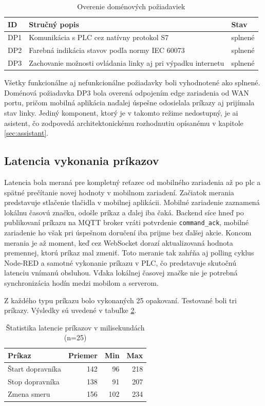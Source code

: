 \begin{table}[H]
\centering
\caption{Overenie doménových požiadaviek}
\label{tab:test-dp}
\begin{tabular}{|l|p{12cm}|l|}
\hline
\textbf{ID} & \textbf{Stručný popis} & \textbf{Stav} \\
\hline
DP1 & Komunikácia s PLC cez natívny protokol S7 & splnené \\
DP2 & Farebná indikácia stavov podľa normy IEC 60073 & splnené \\
DP3 & Zachovanie možnosti ovládania linky aj pri výpadku internetu & splnené \\
\hline
\end{tabular}
\end{table}

Všetky funkcionálne aj nefunkcionálne požiadavky boli vyhodnotené ako splnené. Doménová požiadavka DP3 bola overená odpojením edge zariadenia od WAN portu, pričom mobilná aplikácia naďalej úspešne odosielala príkazy aj prijímala stav linky. Jediný komponent, ktorý je v takomto režime nedostupný, je \acrshort{ai} asistent, čo zodpovedá architektonickému rozhodnutiu opísanému v kapitole \ref{sec:assistant}.

\subsection{Latencia vykonania príkazov}
\label{sec:latencia}

Latencia bola meraná pre kompletný reťazec od mobilného zariadenia až po \acrshort{plc} a spätné prečítanie novej hodnoty v mobilnom zariadení. Začiatok merania predstavuje stlačenie tlačidla v mobilnej aplikácii. Mobilné zariadenie zaznamená lokálnu časovú značku, odošle príkaz a ďalej iba čaká. Backend síce hneď po publikovaní príkazu na MQTT broker vráti potvrdenie \texttt{command\_ack}, mobilné zariadenie ho však pri úspešnom doručení iba prijme bez ďalšej akcie. Koncom merania je až moment, keď cez WebSocket dorazí aktualizovaná hodnota premennej, ktorú príkaz mal zmeniť. Toto meranie tak zahŕňa aj polling cyklus Node-RED a samotné vykonanie príkazu v PLC, čo predstavuje skutočnú latenciu vnímanú obsluhou. Vďaka lokálnej časovej značke nie je potrebná synchronizácia hodín medzi mobilom a serverom.


Z každého typu príkazu bolo vykonaných 25 opakovaní. Testované boli tri príkazy. Výsledky sú uvedené v tabuľke \ref{tab:test-latencia}.

\begin{table}[H]
\centering
\caption{Štatistika latencie príkazov v milisekundách (n=25)}
\label{tab:test-latencia}
\begin{tabular}{|l|r|r|r|}
\hline
\textbf{Príkaz} & \textbf{Priemer} & \textbf{Min} & \textbf{Max} \\
\hline
Štart dopravníka & 142 & 96 & 218 \\
Stop dopravníka  & 138 & 91 & 207 \\
Zmena smeru  & 156 & 102 & 234 \\
\hline
\end{tabular}
\end{table}

